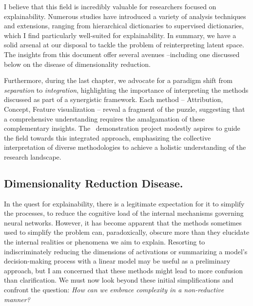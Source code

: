 I believe that this field is incredibly valuable for researchers focused on explainability. Numerous studies have introduced a variety of analysis techniques and extensions, ranging from hierarchical dictionaries to supervised dictionaries, which I find particularly well-suited for explainability.
In summary, we have a solid arsenal at our disposal to tackle the problem of reinterpreting latent space. The insights from this document offer several avenues  --including one discussed below on the disease of dimensionality reduction.

Furthermore, during the last chapter, we advocate for a paradigm shift from \textit{separation} to \textit{integration}, highlighting the importance of interpreting the methods discussed as part of a synergistic framework. Each method -- Attribution, Concept, Feature visualization -- reveal a fragment of the puzzle, suggesting that a comprehensive understanding requires the amalgamation of these complementary insights. The \Lens~demonstration project modestly aspires to guide the field towards this integrated approach, emphasizing the collective interpretation of diverse methodologies to achieve a holistic understanding of the research landscape.


\subsection{Dimensionality Reduction Disease.} In the quest for explainability, there is a legitimate expectation for it to simplify the processes, to reduce the cognitive load of the internal mechanisms governing neural networks. However, it has become apparent that the methods sometimes used to simplify the problem can, paradoxically, obscure more than they elucidate the internal realities or phenomena we aim to explain. Resorting to indiscriminately reducing the dimensions of activations or summarizing a model's decision-making process with a linear model may be useful as a preliminary approach, but I am concerned that these methods might lead to more confusion than clarification. We must now look beyond these initial simplifications and confront the question: \textit{How can we embrace complexity in a non-reductive manner?}

